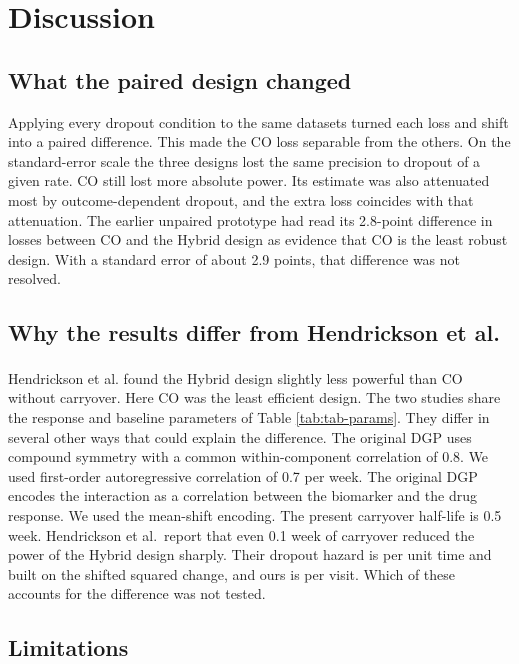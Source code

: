 \documentclass[
  11pt,
]{article}
\begin{document}
\section{Discussion}\label{discussion}

\subsection{What the paired design changed}\label{what-the-paired-design-changed}

Applying every dropout condition to the same datasets turned each loss
and shift into a paired difference. This made the CO loss separable
from the others. On the standard-error scale the three designs lost
the same precision to dropout of a given rate. CO still lost more
absolute power. Its estimate was also attenuated most by
outcome-dependent dropout, and the extra loss coincides with that
attenuation. The earlier unpaired prototype had read its
2.8-point difference in losses
between CO and the Hybrid design as evidence that CO is the least
robust design. With a standard error of about
2.9 points, that difference was not
resolved.

\subsection{Why the results differ from Hendrickson et al.~}\label{sec-hendrickson-diff}

Hendrickson et al.\textsuperscript{} found the Hybrid design slightly less powerful than CO
without carryover. Here CO was the least efficient design. The two
studies share the response and baseline parameters of Table
\ref{tab:tab-params}. They differ in several other ways that could
explain the difference. The original
DGP uses compound symmetry with a common within-component correlation
of 0.8. We used first-order autoregressive correlation of 0.7 per
week. The original DGP encodes the interaction as a correlation
between the biomarker and the drug response. We used the mean-shift
encoding. The present carryover half-life is 0.5 week. Hendrickson et
al.~report that even 0.1 week of carryover reduced the power of the
Hybrid design sharply. Their dropout hazard is per unit time and
built on the shifted squared change, and ours is per visit. Which of
these accounts for the difference was not tested.

\subsection{Limitations}\label{sec-limits}
\end{document}
